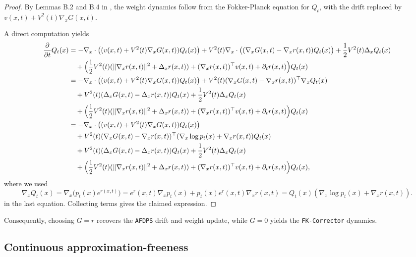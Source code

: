 \documentclass{article}
\theoremstyle{plain}
\theoremstyle{definition}
\theoremstyle{remark}
\begin{document}
\begin{proof}
By Lemmas B.2 and B.4 in \cite{chen2025solving}, the weight dynamics follow from the Fokker-Planck equation for $Q_t$, with the drift replaced by $v(x,t)+V^2(t)\nabla_x G(x,t)$. 

A direct computation yields
\begin{align*}
\frac{\partial}{\partial t}Q_t(x)
&= -\nabla_x\cdot\bigl((v(x,t)+V^2(t)\nabla_x G(x,t))Q_t(x)\bigr)
   + V^2(t)\nabla_x\cdot\bigl((\nabla_x G(x,t)-\nabla_x r(x,t))Q_t(x)\bigr)
   + \frac{1}{2}V^2(t)\Delta_x Q_t(x) \\
&\quad + \Bigl(\frac{1}{2}V^2(t)(\|\nabla_x r(x,t)\|^2+\Delta_x r(x,t))
   + (\nabla_x r(x,t))^\top v(x,t) + \partial_t r(x,t)\Bigr)Q_t(x) \\
&= -\nabla_x\cdot\bigl((v(x,t)+V^2(t)\nabla_x G(x,t))Q_t(x)\bigr)
   + V^2(t)(\nabla_x G(x,t)-\nabla_x r(x,t))^\top\nabla_x Q_t(x) \\
&\quad + V^2(t)(\Delta_x G(x,t)-\Delta_x r(x,t))Q_t(x)
   + \frac{1}{2}V^2(t)\Delta_x Q_t(x) \\
&\quad + \Bigl(\frac{1}{2}V^2(t)(\|\nabla_x r(x,t)\|^2+\Delta_x r(x,t))
      + (\nabla_x r(x,t))^\top v(x,t) + \partial_t r(x,t)\Bigr)Q_t(x) \\
&= -\nabla_x\cdot\bigl((v(x,t)+V^2(t)\nabla_x G(x,t))Q_t(x)\bigr)\\
&\quad + V^2(t)(\nabla_x G(x,t)-\nabla_x r(x,t))^\top(\nabla_x\log p_t(x)+\nabla_x r(x,t))Q_t(x) \\
&\quad + V^2(t)(\Delta_x G(x,t)-\Delta_x r(x,t))Q_t(x)
   + \frac{1}{2}V^2(t)\Delta_x Q_t(x) \\
&\quad + \Bigl(\frac{1}{2}V^2(t)(\|\nabla_x r(x,t)\|^2+\Delta_x r(x,t))
      + (\nabla_x r(x,t))^\top v(x,t) + \partial_t r(x,t)\Bigr)Q_t(x),
\end{align*}
where we used
\[
\nabla_x Q_t(x) = \nabla_x\big(p_t(x) e^{r(x, t)}\big)
= e^r(x, t)\nabla_x p_t(x) + p_t(x) e^r(x, t)\nabla_x r(x, t)
= Q_t(x)(\nabla_x\log p_t(x)+\nabla_x r(x,t)).
\]
in the last equation. Collecting terms gives the claimed expression.
\end{proof}

Consequently, choosing \(G=r\) recovers the \texttt{AFDPS} drift and weight update, while \(G=0\) yields the \texttt{FK-Corrector} dynamics.

\subsection{Continuous approximation-freeness}
\label{app:continuous_approximation-freeness}
\end{document}

